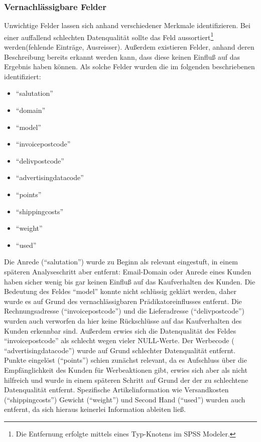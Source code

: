 \documentclass[a4paper,12pt]{article}
\begin{document}
\subsubsection{Vernachlässigbare Felder}
Unwichtige Felder lassen sich anhand verschiedener Merkmale identifizieren. Bei einer
auffallend schlechten Datenqualität sollte das Feld aussortiert\footnote{Die Entfernung erfolgte mittels eines Typ-Knotens im SPSS Modeler.} werden(fehlende Einträge, Ausreisser).
Außerdem existieren Felder, anhand deren Beschreibung bereits erkannt werden
kann, dass diese keinen Einfluß auf das Ergebnis haben können. Als solche Felder wurden die im folgenden beschriebenen identifiziert:
\par
\vspace{1cm}
\begin{minipage}[h]{.5\textwidth}
\begin{itemize}
	\item "`salutation"'
	\item "`domain"'
	\item "`model"'
	\item "`invoicepostcode"'
	\item "`delivpostcode"'
\end{itemize}
\end{minipage}
\hfill
\begin{minipage}[h]{.5\textwidth}
\begin{itemize}
  \item "`advertisingdatacode"'
	\item "`points"'
	\item "`shippingcosts"'
	\item "`weight"'
	\item "`used"'
	\end{itemize}
\end{minipage}
\par
\vspace{1cm}
Die Anrede ("`salutation"') wurde zu Beginn als relevant eingestuft, in einem späteren Analyseschritt aber entfernt:
Email-Domain oder Anrede  eines Kunden haben sicher wenig bis gar keinen Einfluß auf das Kaufverhalten des Kunden. Die Bedeutung des Feldes "`model"' konnte nicht schlüssig geklärt werden, daher wurde es auf Grund des vernachlässigbaren Prädikatoreinflusses entfernt.
Die Rechnungsadresse ("`invoicepostcode"') und die Lieferadresse ("`delivpostcode"') wurden auch verworfen da hier keine Rückschlüsse auf das Kaufverhalten des Kunden erkennbar sind. Außerdem erwies sich die Datenqualität des Feldes "`invoicepostcode"' als schlecht wegen vieler NULL-Werte.
Der Werbecode ( "`advertisingdatacode"') wurde auf Grund schlechter Datenqualität entfernt. Punkte eingelöst ("`points"') schien zunächst relevant, da es Aufschluss über die Empfänglichkeit des Kunden für Werbeaktionen gibt, erwies sich aber als nicht hilfreich und wurde in einem späteren Schritt auf Grund der der zu schlechtene Datenqualität entfernt. Spezifische Artikelinformation wie Versandkosten ("`shippingcosts"') Gewicht ("`weight"') und Second Hand ("`used"') wurden auch entfernt, da sich hieraus keinerlei Information ableiten ließ.
\end{document}
